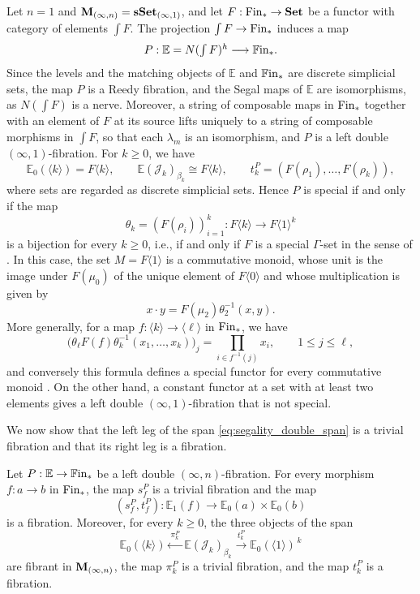 \documentclass[10pt,reqno]{amsart}
\begin{document}
\begin{ex}%
\label{ex:discrete_commutative_monoid}
Let $n=1$ and $\mathbf M_{(\infty,n)}=\mathbf{sSet}_{(\infty,1)}$, and let
$F:\mathrm{Fin}_*\to\mathbf{Set}$ be a functor with category of elements
$\int F$. The projection $\int F\to\mathrm{Fin}_*$ induces a map
\[
P:\mathbb E=N(\textstyle\int F)^h\longrightarrow\mathbb{F}\mathrm{in}_*.
\]
Since the levels and the matching objects of $\mathbb E$ and
$\mathbb{F}\mathrm{in}_*$ are discrete simplicial sets, the map $P$ is a Reedy
fibration, and the Segal maps of $\mathbb E$ are isomorphisms, as
$N(\int F)$ is a nerve. Moreover, a string of composable maps in
$\mathrm{Fin}_*$ together with an element of $F$ at its source lifts
uniquely to a string of composable morphisms in $\int F$, so that
each $\lambda_m$ is an isomorphism, and $P$ is a left double
$(\infty,1)$-fibration. For $k\geq0$, we have
\[
\mathbb E_0(\langle k\rangle)=F\langle k\rangle,
\qquad
\mathbb E(\mathcal J_k)_{\beta_k}\cong F\langle k\rangle,
\qquad
t_k^P=(F(\rho_1),\ldots,F(\rho_k)),
\]
where sets are regarded as discrete simplicial sets. Hence $P$ is
special if and only if the map
\[
\theta_k=(F(\rho_i))_{i=1}^k:
F\langle k\rangle\longrightarrow F\langle1\rangle^k
\]
is a bijection for every $k\geq0$, i.e., if and only if $F$ is a
special $\Gamma$-set in the sense of \cite{Seg74}. In this case,
the set $M=F\langle1\rangle$ is a commutative monoid, whose unit is
the image under $F(\mu_0)$ of the unique element of
$F\langle0\rangle$ and whose multiplication is given by
\[
x\cdot y=F(\mu_2)\theta_2^{-1}(x,y).
\]
More generally, for a map
$f:\langle k\rangle\to\langle\ell\rangle$ in $\mathrm{Fin}_*$, we have
\[
\bigl(\theta_{\ell}F(f)\theta_k^{-1}(x_1,\ldots,x_k)\bigr)_j
=\prod_{i\in f^{-1}(j)}x_i,
\qquad 1\leq j\leq\ell,
\]
and conversely this formula defines a special functor for every
commutative monoid \cite{Seg74}. On the other hand, a constant functor
at a set with at least two elements gives a left double
$(\infty,1)$-fibration that is not special.
\end{ex}

We now show that the left leg of the span
\eqref{eq:segality_double_span} is a trivial fibration and that its
right leg is a fibration.

\begin{proposition}
\label{prop:cleavage_free_segal}
Let $P:\mathbb E\to\mathbb{F}\mathrm{in}_*$ be a left double
$(\infty,n)$-fibration. For every morphism $f:a\to b$ in $\mathrm{Fin}_*$,
the map $s_f^P$ is a trivial fibration and the map
\[
(s_f^P,t_f^P):\mathbb E_1(f)\longrightarrow
\mathbb E_0(a)\times\mathbb E_0(b)
\]
is a fibration. Moreover, for every $k\geq0$, the three objects of
the span
\[
\mathbb E_0(\langle k\rangle)
\xleftarrow{\ \pi_k^P\ }
\mathbb E(\mathcal J_k)_{\beta_k}
\xrightarrow{\ t_k^P\ }
\mathbb E_0(\langle1\rangle)^{\,k}
\]
are fibrant in $\mathbf M_{(\infty,n)}$, the map $\pi_k^P$ is a trivial fibration,
and the map $t_k^P$ is a fibration.
\end{proposition}
\end{document}
